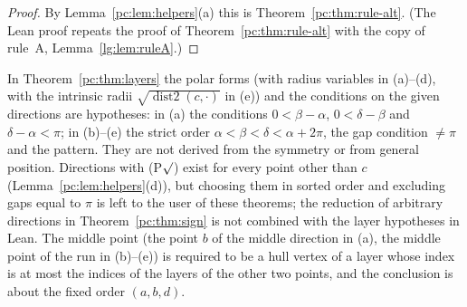 \begin{proof}
By Lemma~\ref{pc:lem:helpers}(a) this is Theorem~\ref{pc:thm:rule-alt}. (The Lean proof repeats the proof of
Theorem~\ref{pc:thm:rule-alt} with the  copy of rule~A, Lemma~\ref{lg:lem:ruleA}.)
\end{proof}

\begin{remark}\label{pc:rem:layers-scope}
In Theorem~\ref{pc:thm:layers} the polar forms (with radius variables in (a)--(d), with the intrinsic radii
$\sqrt{\operatorname{dist2}(c,\cdot)}$ in (e)) and the conditions on the given directions are hypotheses: in (a)
the conditions $0<\beta-\alpha$, $0<\delta-\beta$ and $\delta-\alpha<\pi$; in (b)--(e) the strict order
$\alpha<\beta<\delta<\alpha+2\pi$, the gap condition $\neq\pi$ and the pattern. They are not derived from the
symmetry or from general position. Directions with (P$\surd$) exist for every point other than $c$
(Lemma~\ref{pc:lem:helpers}(d)), but choosing them in sorted order and excluding gaps equal to $\pi$ is left to the
user of these theorems; the reduction of arbitrary directions in Theorem~\ref{pc:thm:sign} is not combined with
the layer hypotheses in Lean. The middle point (the point $b$ of the middle direction in (a), the middle point of
the run in (b)--(e)) is required to be a hull vertex of a layer whose index is at most the indices of the layers
of the other two points, and the conclusion is about the fixed order $(a,b,d)$.
\end{remark}

